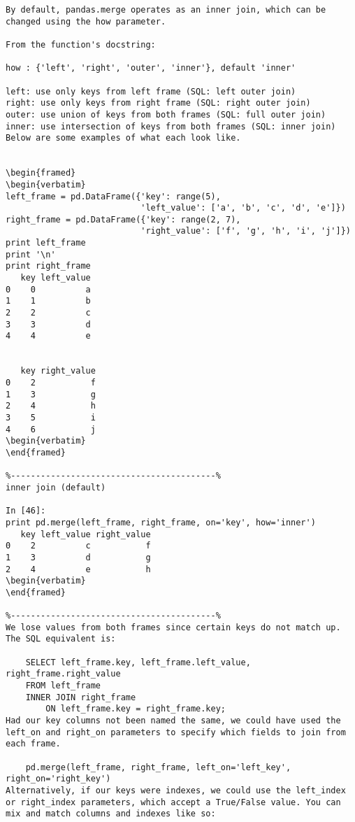 \begin{framed}
\begin{verbatim}
By default, pandas.merge operates as an inner join, which can be changed using the how parameter.

From the function's docstring:

how : {'left', 'right', 'outer', 'inner'}, default 'inner'

left: use only keys from left frame (SQL: left outer join)
right: use only keys from right frame (SQL: right outer join)
outer: use union of keys from both frames (SQL: full outer join)
inner: use intersection of keys from both frames (SQL: inner join)
Below are some examples of what each look like.


\begin{framed}
\begin{verbatim}
left_frame = pd.DataFrame({'key': range(5), 
                           'left_value': ['a', 'b', 'c', 'd', 'e']})
right_frame = pd.DataFrame({'key': range(2, 7), 
                           'right_value': ['f', 'g', 'h', 'i', 'j']})
print left_frame
print '\n'
print right_frame
   key left_value
0    0          a
1    1          b
2    2          c
3    3          d
4    4          e


   key right_value
0    2           f
1    3           g
2    4           h
3    5           i
4    6           j
\begin{verbatim}
\end{framed}

%-----------------------------------------%
inner join (default)

In [46]:
print pd.merge(left_frame, right_frame, on='key', how='inner')
   key left_value right_value
0    2          c           f
1    3          d           g
2    4          e           h
\begin{verbatim}
\end{framed}

%-----------------------------------------%
We lose values from both frames since certain keys do not match up. The SQL equivalent is:

    SELECT left_frame.key, left_frame.left_value, right_frame.right_value
    FROM left_frame
    INNER JOIN right_frame
        ON left_frame.key = right_frame.key;
Had our key columns not been named the same, we could have used the left_on and right_on parameters to specify which fields to join from each frame.

    pd.merge(left_frame, right_frame, left_on='left_key', right_on='right_key')
Alternatively, if our keys were indexes, we could use the left_index or right_index parameters, which accept a True/False value. You can mix and match columns and indexes like so:


\end{verbatim}
\end{framed}
